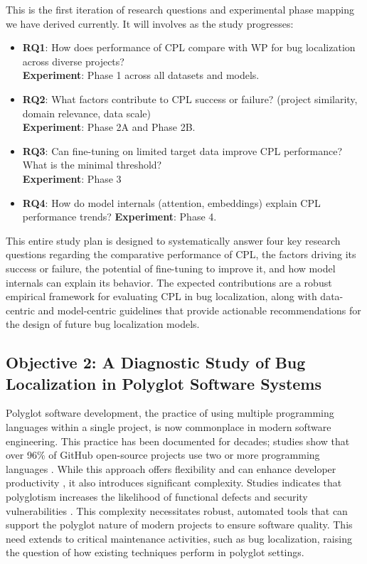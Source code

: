 \documentclass[12pt,table,xcdraw]{article}
\begin{document}
This is the first iteration of research questions and experimental phase mapping we have derived currently. It will involves as the study progresses:
\begin{itemize}
    \item \textbf{RQ1}: How does performance of CPL compare with WP for bug localization across diverse projects?\\
            \textbf{Experiment}: Phase 1 across all datasets and models.
    \item \textbf{RQ2}: What factors contribute to CPL success or failure? (project similarity, domain relevance, data scale) \\
        \textbf{Experiment}: Phase 2A and Phase 2B.
    \item \textbf{RQ3}: Can fine-tuning on limited target data improve CPL performance? What is the minimal threshold?\\
        \textbf{Experiment}: Phase 3
    \item \textbf{RQ4}: How do model internals (attention, embeddings) explain CPL performance trends?
        \textbf{Experiment}: Phase 4.
\end{itemize}


This entire study plan is designed to systematically answer four key research questions regarding the comparative performance of CPL, the factors driving its success or failure, the potential of fine-tuning to improve it, and how model internals can explain its behavior. The expected contributions are a robust empirical framework for evaluating CPL in bug localization, along with data-centric and model-centric guidelines that provide actionable recommendations for the design of future bug localization models.

\subsection{Objective 2: A Diagnostic Study of Bug Localization in Polyglot Software Systems}
Polyglot software development, the practice of using multiple programming languages within a single project, is now commonplace in modern software engineering. This practice has been documented for decades; studies show that over 96\% of GitHub open-source projects use two or more programming languages \cite{tomassetti2014empirical}. While this approach offers flexibility and can enhance developer productivity \cite{abidi2019behind}, it also introduces significant complexity. Studies indicates that polyglotism increases the likelihood of functional defects and security vulnerabilities \cite{yang2024multi,maurina2025babelrts}. This complexity necessitates robust, automated tools that can support the polyglot nature of modern projects to ensure software quality. This need extends to critical maintenance activities, such as bug localization, raising the question of how existing techniques perform in polyglot settings.
\end{document}
